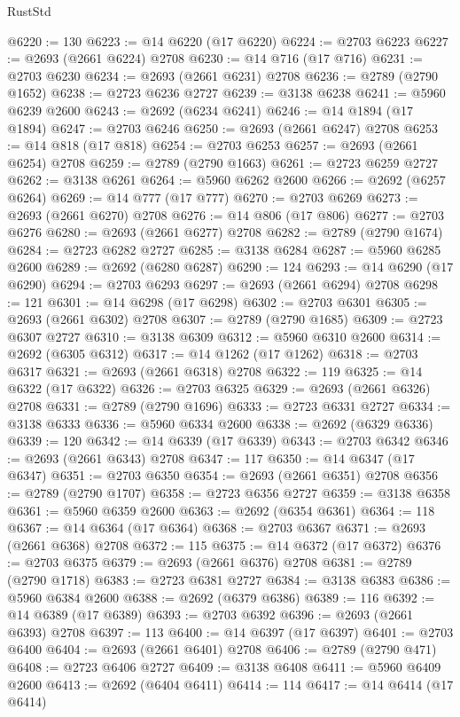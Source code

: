\begin{lexlean}{RustStd}
\begin{coremodule}
@6220 := 130
@6223 := @14 @6220 (@17 @6220)
@6224 := @2703 @6223
@6227 := @2693 (@2661 @6224) @2708
@6230 := @14 @716 (@17 @716)
@6231 := @2703 @6230
@6234 := @2693 (@2661 @6231) @2708
@6236 := @2789 (@2790 @1652)
@6238 := @2723 @6236 @2727
@6239 := @3138 @6238
@6241 := @5960 @6239 @2600
@6243 := @2692 (@6234 @6241)
@6246 := @14 @1894 (@17 @1894)
@6247 := @2703 @6246
@6250 := @2693 (@2661 @6247) @2708
@6253 := @14 @818 (@17 @818)
@6254 := @2703 @6253
@6257 := @2693 (@2661 @6254) @2708
@6259 := @2789 (@2790 @1663)
@6261 := @2723 @6259 @2727
@6262 := @3138 @6261
@6264 := @5960 @6262 @2600
@6266 := @2692 (@6257 @6264)
@6269 := @14 @777 (@17 @777)
@6270 := @2703 @6269
@6273 := @2693 (@2661 @6270) @2708
@6276 := @14 @806 (@17 @806)
@6277 := @2703 @6276
@6280 := @2693 (@2661 @6277) @2708
@6282 := @2789 (@2790 @1674)
@6284 := @2723 @6282 @2727
@6285 := @3138 @6284
@6287 := @5960 @6285 @2600
@6289 := @2692 (@6280 @6287)
@6290 := 124
@6293 := @14 @6290 (@17 @6290)
@6294 := @2703 @6293
@6297 := @2693 (@2661 @6294) @2708
@6298 := 121
@6301 := @14 @6298 (@17 @6298)
@6302 := @2703 @6301
@6305 := @2693 (@2661 @6302) @2708
@6307 := @2789 (@2790 @1685)
@6309 := @2723 @6307 @2727
@6310 := @3138 @6309
@6312 := @5960 @6310 @2600
@6314 := @2692 (@6305 @6312)
@6317 := @14 @1262 (@17 @1262)
@6318 := @2703 @6317
@6321 := @2693 (@2661 @6318) @2708
@6322 := 119
@6325 := @14 @6322 (@17 @6322)
@6326 := @2703 @6325
@6329 := @2693 (@2661 @6326) @2708
@6331 := @2789 (@2790 @1696)
@6333 := @2723 @6331 @2727
@6334 := @3138 @6333
@6336 := @5960 @6334 @2600
@6338 := @2692 (@6329 @6336)
@6339 := 120
@6342 := @14 @6339 (@17 @6339)
@6343 := @2703 @6342
@6346 := @2693 (@2661 @6343) @2708
@6347 := 117
@6350 := @14 @6347 (@17 @6347)
@6351 := @2703 @6350
@6354 := @2693 (@2661 @6351) @2708
@6356 := @2789 (@2790 @1707)
@6358 := @2723 @6356 @2727
@6359 := @3138 @6358
@6361 := @5960 @6359 @2600
@6363 := @2692 (@6354 @6361)
@6364 := 118
@6367 := @14 @6364 (@17 @6364)
@6368 := @2703 @6367
@6371 := @2693 (@2661 @6368) @2708
@6372 := 115
@6375 := @14 @6372 (@17 @6372)
@6376 := @2703 @6375
@6379 := @2693 (@2661 @6376) @2708
@6381 := @2789 (@2790 @1718)
@6383 := @2723 @6381 @2727
@6384 := @3138 @6383
@6386 := @5960 @6384 @2600
@6388 := @2692 (@6379 @6386)
@6389 := 116
@6392 := @14 @6389 (@17 @6389)
@6393 := @2703 @6392
@6396 := @2693 (@2661 @6393) @2708
@6397 := 113
@6400 := @14 @6397 (@17 @6397)
@6401 := @2703 @6400
@6404 := @2693 (@2661 @6401) @2708
@6406 := @2789 (@2790 @471)
@6408 := @2723 @6406 @2727
@6409 := @3138 @6408
@6411 := @5960 @6409 @2600
@6413 := @2692 (@6404 @6411)
@6414 := 114
@6417 := @14 @6414 (@17 @6414)

\end{coremodule}
\end{lexlean}
